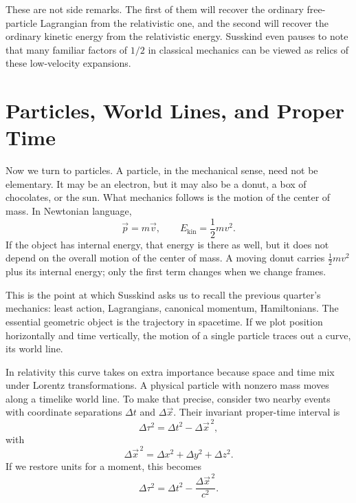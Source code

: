 These are not side remarks. The first of them will recover the ordinary free-particle Lagrangian from the relativistic one, and the second will recover the ordinary kinetic energy from the relativistic energy. Susskind even pauses to note that many familiar factors of \(1/2\) in classical mechanics can be viewed as relics of these low-velocity expansions.

\section{Particles, World Lines, and Proper Time}

Now we turn to particles. A particle, in the mechanical sense, need not be elementary. It may be an electron, but it may also be a donut, a box of chocolates, or the sun. What mechanics follows is the motion of the center of mass. In Newtonian language,
\begin{equation}
\vec p = m\vec v,
\qquad
E_{\text{kin}}=\frac12 mv^2.
\end{equation}
If the object has internal energy, that energy is there as well, but it does not depend on the overall motion of the center of mass. A moving donut carries \(\tfrac12 mv^2\) plus its internal energy; only the first term changes when we change frames.

This is the point at which Susskind asks us to recall the previous quarter's mechanics: least action, Lagrangians, canonical momentum, Hamiltonians. The essential geometric object is the trajectory in spacetime. If we plot position horizontally and time vertically, the motion of a single particle traces out a curve, its world line.

In relativity this curve takes on extra importance because space and time mix under Lorentz transformations. A physical particle with nonzero mass moves along a timelike world line. To make that precise, consider two nearby events with coordinate separations \(\Delta t\) and \(\Delta \vec x\). Their invariant proper-time interval is
\begin{equation}
\Delta \tau^2 = \Delta t^2 - \Delta \vec x^{\,2},
\end{equation}
with
\begin{equation}
\Delta \vec x^{\,2} = \Delta x^2+\Delta y^2+\Delta z^2.
\end{equation}
If we restore units for a moment, this becomes
\begin{equation}
\Delta \tau^2=\Delta t^2-\frac{\Delta \vec x^{\,2}}{c^2}.
\end{equation}

